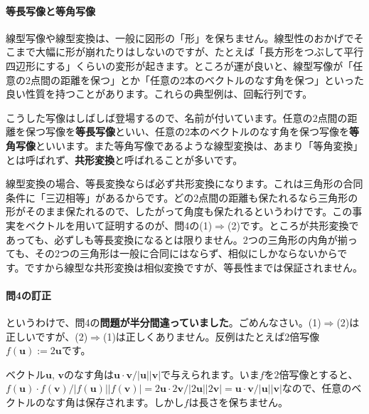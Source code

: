 \paragraph{等長写像と等角写像} 

線型写像や線型変換は、一般に図形の「形」を保ちません。線型性のおかげでそこまで大幅に形が崩れたりはしないのですが、たとえば「長方形をつぶして平行四辺形にする」くらいの変形が起きます。ところが運が良いと、線型写像が「任意の$2$点間の距離を保つ」とか「任意の$2$本のベクトルのなす角を保つ」といった良い性質を持つことがあります。これらの典型例は、回転行列です。

こうした写像はしばしば登場するので、名前が付いています。任意の$2$点間の距離を保つ写像を\textbf{等長写像}といい、任意の$2$本のベクトルのなす角を保つ写像を\textbf{等角写像}といいます。また等角写像であるような線型変換は、あまり「等角変換」とは呼ばれず、\textbf{共形変換}と呼ばれることが多いです。

線型変換の場合、等長変換ならば必ず共形変換になります。これは三角形の合同条件に「三辺相等」があるからです。どの$2$点間の距離も保たれるなら三角形の形がそのまま保たれるので、したがって角度も保たれるというわけです。この事実をベクトルを用いて証明するのが、問4の(1)$\Rightarrow$(2)です。ところが共形変換であっても、必ずしも等長変換になるとは限りません。$2$つの三角形の内角が揃っても、その$2$つの三角形は一般に合同にはならず、相似にしかならないからです。ですから線型な共形変換は相似変換ですが、等長性までは保証されません。

\paragraph{問4の訂正} というわけで、問4の\textbf{問題が半分間違っていました}。ごめんなさい。(1)$\Rightarrow$(2)は正しいですが、(2)$\Rightarrow$(1)は正しくありません。反例はたとえば$2$倍写像$f(\bm{u}) := 2\bm{u}$です。

ベクトル$\bm{u}$, $\bm{v}$のなす角は$\bm{u}\cdot\bm{v}/|\bm{u}||\bm{v}|$で与えられます。いま$f$を$2$倍写像とすると、$f(\bm{u})\cdot f(\bm{v})/|f(\bm{u})||f(\bm{v})| = 2\bm{u}\cdot2\bm{v}/|2\bm{u}||2\bm{v}| = \bm{u}\cdot\bm{v}/|\bm{u}||\bm{v}|$なので、任意のベクトルのなす角は保存されます。しかし$f$は長さを保ちません。

